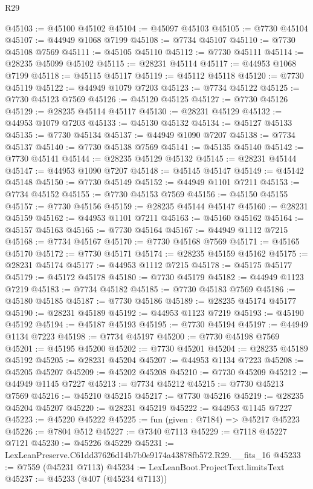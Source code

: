 \begin{lexlean}{R29}
\begin{coremodule}
@45103 := @45100 @45102
@45104 := @45097 @45103
@45105 := @7730 @45104
@45107 := @44949 @1068 @7199
@45108 := @7734 @45107
@45110 := @7730 @45108 @7569
@45111 := @45105 @45110
@45112 := @7730 @45111
@45114 := @28235 @45099 @45102
@45115 := @28231 @45114
@45117 := @44953 @1068 @7199
@45118 := @45115 @45117
@45119 := @45112 @45118
@45120 := @7730 @45119
@45122 := @44949 @1079 @7203
@45123 := @7734 @45122
@45125 := @7730 @45123 @7569
@45126 := @45120 @45125
@45127 := @7730 @45126
@45129 := @28235 @45114 @45117
@45130 := @28231 @45129
@45132 := @44953 @1079 @7203
@45133 := @45130 @45132
@45134 := @45127 @45133
@45135 := @7730 @45134
@45137 := @44949 @1090 @7207
@45138 := @7734 @45137
@45140 := @7730 @45138 @7569
@45141 := @45135 @45140
@45142 := @7730 @45141
@45144 := @28235 @45129 @45132
@45145 := @28231 @45144
@45147 := @44953 @1090 @7207
@45148 := @45145 @45147
@45149 := @45142 @45148
@45150 := @7730 @45149
@45152 := @44949 @1101 @7211
@45153 := @7734 @45152
@45155 := @7730 @45153 @7569
@45156 := @45150 @45155
@45157 := @7730 @45156
@45159 := @28235 @45144 @45147
@45160 := @28231 @45159
@45162 := @44953 @1101 @7211
@45163 := @45160 @45162
@45164 := @45157 @45163
@45165 := @7730 @45164
@45167 := @44949 @1112 @7215
@45168 := @7734 @45167
@45170 := @7730 @45168 @7569
@45171 := @45165 @45170
@45172 := @7730 @45171
@45174 := @28235 @45159 @45162
@45175 := @28231 @45174
@45177 := @44953 @1112 @7215
@45178 := @45175 @45177
@45179 := @45172 @45178
@45180 := @7730 @45179
@45182 := @44949 @1123 @7219
@45183 := @7734 @45182
@45185 := @7730 @45183 @7569
@45186 := @45180 @45185
@45187 := @7730 @45186
@45189 := @28235 @45174 @45177
@45190 := @28231 @45189
@45192 := @44953 @1123 @7219
@45193 := @45190 @45192
@45194 := @45187 @45193
@45195 := @7730 @45194
@45197 := @44949 @1134 @7223
@45198 := @7734 @45197
@45200 := @7730 @45198 @7569
@45201 := @45195 @45200
@45202 := @7730 @45201
@45204 := @28235 @45189 @45192
@45205 := @28231 @45204
@45207 := @44953 @1134 @7223
@45208 := @45205 @45207
@45209 := @45202 @45208
@45210 := @7730 @45209
@45212 := @44949 @1145 @7227
@45213 := @7734 @45212
@45215 := @7730 @45213 @7569
@45216 := @45210 @45215
@45217 := @7730 @45216
@45219 := @28235 @45204 @45207
@45220 := @28231 @45219
@45222 := @44953 @1145 @7227
@45223 := @45220 @45222
@45225 := fun (given : @7184) => @45217 @45223
@45226 := @7804 @512
@45227 := @7340 @7113
@45229 := @7118 @45227 @7121
@45230 := @45226 @45229
@45231 := LexLeanPreserve.C61dd37626d14b7b0e9174a43878fb572.R29.__fits_16
@45233 := @7559 (@45231 @7113)
@45234 := LexLeanBoot.ProjectText.limitsText
@45237 := @45233 (@407 (@45234 @7113))

\end{coremodule}
\end{lexlean}
